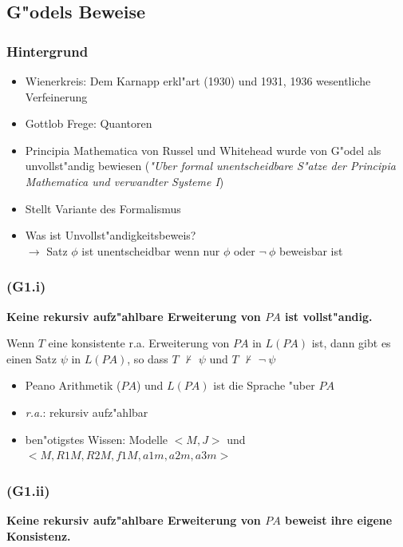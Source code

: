 \documentclass[]{scrartcl}
\begin{document}
\subsection{G"odels Beweise}
\subsubsection{Hintergrund}

\begin{itemize}
  \item Wienerkreis: Dem Karnapp erkl"art (1930) und 1931, 1936 wesentliche Verfeinerung
  \item Gottlob Frege: Quantoren
  \item Principia Mathematica von Russel und Whitehead wurde von G"odel als unvollst"andig bewiesen (\emph{"Uber formal unentscheidbare S"atze der Principia Mathematica und verwandter Systeme I})
  \item Stellt Variante des Formalismus 
  \item Was ist Unvollst"andigkeitsbeweis?\\ $\rightarrow$ Satz $\phi$ ist unentscheidbar wenn nur $\phi$ oder $\neg~\phi$ beweisbar ist
\end{itemize}

\subsubsection{(G1.i)}

\textbf{Keine rekursiv aufz"ahlbare Erweiterung von $PA$ ist vollst"andig.}
\newline

Wenn $T$ eine konsistente r.a. Erweiterung von $PA$ in $L(PA)$ ist, dann gibt es einen Satz $\psi$ in $L(PA)$, so dass $T$ $\not \vdash$ $\psi$ und $T$ $\not \vdash$ $\neg~\psi$

\begin{itemize}
  \item Peano Arithmetik ($PA$) und $L(PA)$ ist die Sprache "uber $PA$
  \item \emph{r.a.}: rekursiv aufz"ahlbar
  \item ben"otigstes Wissen: Modelle $<M, J>$ und $<M, R1M, R2M, f1M, a1m, a2m, a3m>$
\end{itemize}

\subsubsection{(G1.ii)}
\textbf{Keine rekursiv aufz"ahlbare Erweiterung von $PA$ beweist ihre eigene Konsistenz.}
\newline
\end{document}
